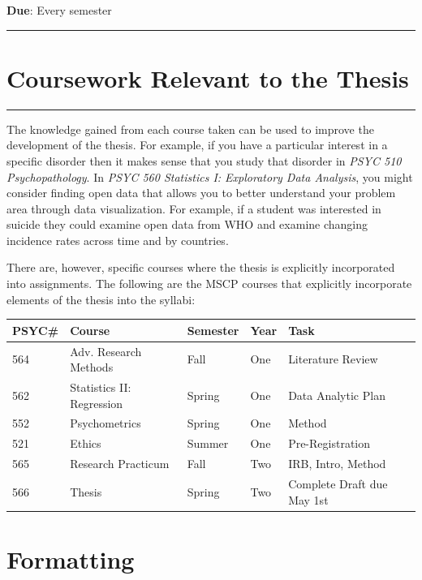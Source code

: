 \documentclass[openany]{book}
\begin{document}
\textbf{Due}: Every semester

\begin{center}\rule{0.5\linewidth}{0.5pt}\end{center}

\hypertarget{coursework-relevant-to-the-thesis}{%
\chapter{Coursework Relevant to the Thesis}\label{coursework-relevant-to-the-thesis}}

\begin{center}\rule{0.5\linewidth}{0.5pt}\end{center}

The knowledge gained from each course taken can be used to improve the development of the thesis. For example, if you have a particular interest in a specific disorder then it makes sense that you study that disorder in \emph{PSYC 510 Psychopathology}. In \emph{PSYC 560 Statistics I: Exploratory Data Analysis}, you might consider finding open data that allows you to better understand your problem area through data visualization. For example, if a student was interested in suicide they could examine open data from WHO and examine changing incidence rates across time and by countries.

There are, however, specific courses where the thesis is explicitly incorporated into assignments. The following are the MSCP courses that explicitly incorporate elements of the thesis into the syllabi:

\begin{longtable}[]{@{}lllll@{}}
\toprule
PSYC\# & Course & Semester & Year & Task\tabularnewline
\midrule
\endhead
564 & Adv. Research Methods & Fall & One & Literature Review\tabularnewline
562 & Statistics II: Regression & Spring & One & Data Analytic Plan\tabularnewline
552 & Psychometrics & Spring & One & Method\tabularnewline
521 & Ethics & Summer & One & Pre-Registration\tabularnewline
565 & Research Practicum & Fall & Two & IRB, Intro, Method\tabularnewline
566 & Thesis & Spring & Two & Complete Draft due May 1st\tabularnewline
\bottomrule
\end{longtable}

\hypertarget{formatting}{%
\chapter{Formatting}\label{formatting}}
\end{document}
